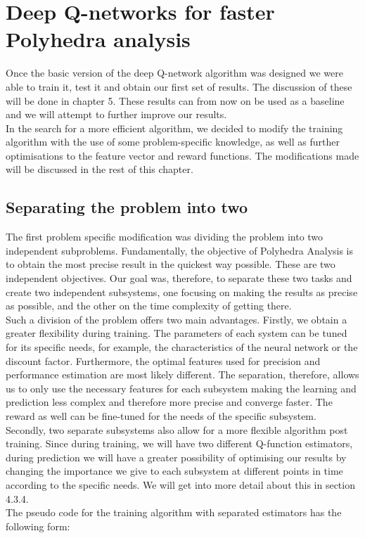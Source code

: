 \section{Deep Q-networks for faster Polyhedra analysis}
Once the basic version of the deep Q-network algorithm was designed we were able to train it, test it and obtain our first set of results. The discussion of these will be done in chapter 5. These results can from now on be used as a baseline and we will attempt to further improve our results.\\
In the search for a more efficient algorithm, we decided to modify the training algorithm with the use of some problem-specific knowledge, as well as further optimisations to the feature vector and reward functions. The modifications made will be discussed in the rest of this chapter.


\subsection{Separating the problem into two}
The first problem specific modification was dividing the problem into two independent subproblems. Fundamentally, the objective of Polyhedra Analysis is to obtain the most precise result in the quickest way possible. These are two independent objectives. Our goal was, therefore, to separate these two tasks and create two independent subsystems, one focusing on making the results as precise as possible, and the other on the time complexity of getting there.\\
 Such a division of the problem offers two main advantages. Firstly, we obtain a greater flexibility during training. The parameters of each system can be tuned for its specific needs, for example, the characteristics of the neural network or the discount factor. Furthermore, the optimal features used for precision and performance estimation are most likely different. The separation, therefore, allows us to only use the necessary features for each subsystem making the learning and prediction less complex and therefore more precise and converge faster. The reward as well can be fine-tuned for the needs of the specific subsystem.\\ 
 Secondly, two separate subsystems also allow for a more flexible algorithm post training. Since during training, we will have two different Q-function estimators, during prediction we will have a greater possibility of optimising our results by changing the importance we give to each subsystem at different points in time according to the specific needs. We will get into more detail about this in section 4.3.4.\\
 The pseudo code for the training algorithm with separated estimators has the following form:


